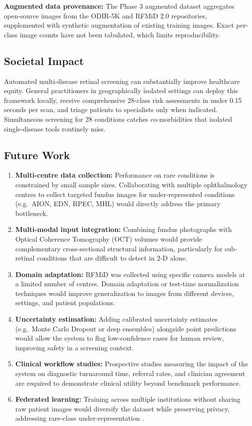 \documentclass[conference]{IEEEtran}
\begin{document}
\textbf{Augmented data provenance:} The Phase 3 augmented dataset aggregates open-source images from the ODIR-5K \cite{kaggle_odir5k} and RFMiD 2.0 \cite{pachade2023rfmid2} repositories, supplemented with synthetic augmentation of existing training images. Exact per-class image counts have not been tabulated, which limits reproducibility.

\subsection{Societal Impact}
Automated multi-disease retinal screening can substantially improve healthcare equity. General practitioners in geographically isolated settings can deploy this framework locally, receive comprehensive 28-class risk assessments in under 0.15 seconds per scan, and triage patients to specialists only when indicated. Simultaneous screening for 28 conditions catches co-morbidities that isolated single-disease tools routinely miss.

\subsection{Future Work}
\begin{enumerate}
    \item \textbf{Multi-centre data collection:} Performance on rare conditions is constrained by small sample sizes. Collaborating with multiple ophthalmology centres to collect targeted fundus images for under-represented conditions (e.g.\ AION, EDN, RPEC, MHL) would directly address the primary bottleneck.
    \item \textbf{Multi-modal input integration:} Combining fundus photographs with Optical Coherence Tomography (OCT) volumes would provide complementary cross-sectional structural information, particularly for sub-retinal conditions that are difficult to detect in 2-D alone.
    \item \textbf{Domain adaptation:} RFMiD was collected using specific camera models at a limited number of centres. Domain adaptation or test-time normalization techniques would improve generalization to images from different devices, settings, and patient populations.
    \item \textbf{Uncertainty estimation:} Adding calibrated uncertainty estimates (e.g.\ Monte Carlo Dropout or deep ensembles) alongside point predictions would allow the system to flag low-confidence cases for human review, improving safety in a screening context.
    \item \textbf{Clinical workflow studies:} Prospective studies measuring the impact of the system on diagnostic turnaround time, referral rates, and clinician agreement are required to demonstrate clinical utility beyond benchmark performance.
    \item \textbf{Federated learning:} Training across multiple institutions without sharing raw patient images would diversify the dataset while preserving privacy, addressing rare-class under-representation \cite{rieke2020future}.
\end{enumerate}
\end{document}
